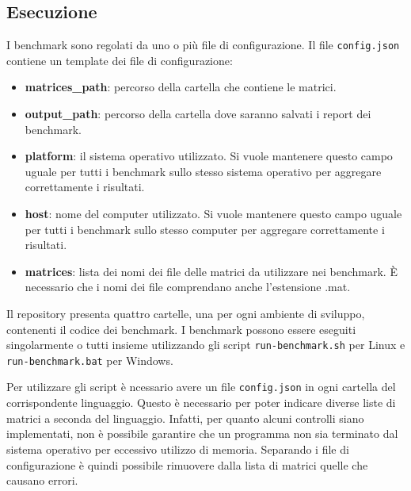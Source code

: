 \documentclass[a4paper, 12pt]{article}
\begin{document}
        \subsection{Esecuzione}
            I benchmark sono regolati da uno o più file di configurazione. 
            Il file \texttt{config.json} contiene un template dei file di 
            configurazione:
            \begin{itemize}
                \item \textbf{matrices\_path}: percorso della cartella che 
                contiene le matrici.
                \item \textbf{output\_path}: percorso della cartella dove 
                saranno salvati i report dei benchmark.
                \item \textbf{platform}: il sistema operativo utilizzato.
                Si vuole mantenere questo campo uguale per tutti i benchmark
                sullo stesso sistema operativo per aggregare correttamente i
                risultati.
                \item \textbf{host}: nome del computer utilizzato.
                Si vuole mantenere questo campo uguale per tutti i benchmark
                sullo stesso computer per aggregare correttamente i
                risultati.
                \item \textbf{matrices}: lista dei nomi dei file delle matrici 
                da utilizzare nei benchmark. \`E necessario che i nomi dei file
                comprendano anche l'estensione .mat.
            \end{itemize}

            Il repository presenta quattro cartelle, una per ogni ambiente di
            sviluppo, contenenti il codice dei benchmark. I benchmark possono 
            essere eseguiti singolarmente o tutti insieme utilizzando gli script
            \texttt{run-benchmark.sh} per Linux e \texttt{run-benchmark.bat} per
            Windows.
            
            Per utilizzare gli script è ncessario avere un file 
            \texttt{config.json} in ogni cartella del corrispondente linguaggio.
            Questo è necessario per poter indicare diverse liste di matrici a 
            seconda del linguaggio. Infatti, per quanto alcuni controlli siano 
            implementati, non è possibile garantire che un programma non sia 
            terminato dal sistema operativo per eccessivo utilizzo di memoria.
            Separando i file di configurazione è quindi possibile rimuovere 
            dalla lista di matrici quelle che causano errori.
\end{document}
